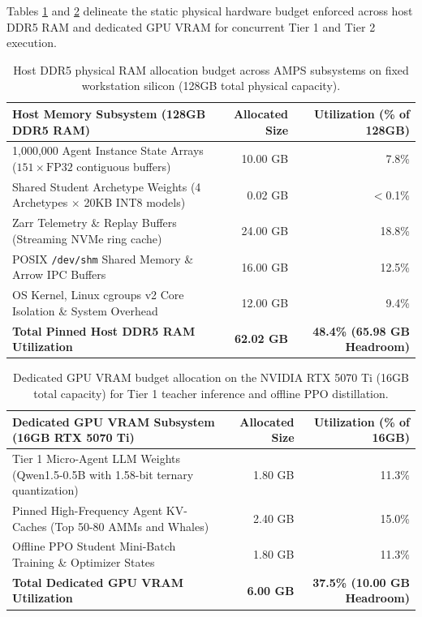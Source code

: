 Tables \ref{tab:hardware_budget_allocation} and \ref{tab:vram_budget_allocation} delineate the static physical hardware budget enforced across host DDR5 RAM and dedicated GPU VRAM for concurrent Tier 1 and Tier 2 execution.

\begin{table}[htbp]
\centering
\small
\renewcommand{\arraystretch}{1.05}
\begin{tabularx}{\textwidth}{X r r}
\toprule
\textbf{Host Memory Subsystem (128GB DDR5 RAM)} & \textbf{Allocated Size} & \textbf{Utilization (\% of 128GB)} \\
\midrule
1,000,000 Agent Instance State Arrays ($151 \times \text{FP32}$ contiguous buffers) & 10.00 GB & 7.8\% \\
Shared Student Archetype Weights (4 Archetypes $\times$ 20KB INT8 models) & 0.02 GB & $<$0.1\% \\
Zarr Telemetry \& Replay Buffers (Streaming NVMe ring cache) & 24.00 GB & 18.8\% \\
POSIX \texttt{/dev/shm} Shared Memory \& Arrow IPC Buffers & 16.00 GB & 12.5\% \\
OS Kernel, Linux cgroups v2 Core Isolation \& System Overhead & 12.00 GB & 9.4\% \\
\midrule
\textbf{Total Pinned Host DDR5 RAM Utilization} & \textbf{62.02 GB} & \textbf{48.4\% (65.98 GB Headroom)} \\
\bottomrule
\end{tabularx}
\caption{Host DDR5 physical RAM allocation budget across AMPS subsystems on fixed workstation silicon (128GB total physical capacity).}
\label{tab:hardware_budget_allocation}
\end{table}

\begin{table}[htbp]
\centering
\small
\renewcommand{\arraystretch}{1.05}
\begin{tabularx}{\textwidth}{X r r}
\toprule
\textbf{Dedicated GPU VRAM Subsystem (16GB RTX 5070 Ti)} & \textbf{Allocated Size} & \textbf{Utilization (\% of 16GB)} \\
\midrule
Tier 1 Micro-Agent LLM Weights (Qwen1.5-0.5B with 1.58-bit ternary quantization) & 1.80 GB & 11.3\% \\
Pinned High-Frequency Agent KV-Caches (Top 50-80 AMMs and Whales) & 2.40 GB & 15.0\% \\
Offline PPO Student Mini-Batch Training \& Optimizer States & 1.80 GB & 11.3\% \\
\midrule
\textbf{Total Dedicated GPU VRAM Utilization} & \textbf{6.00 GB} & \textbf{37.5\% (10.00 GB Headroom)} \\
\bottomrule
\end{tabularx}
\caption{Dedicated GPU VRAM budget allocation on the NVIDIA RTX 5070 Ti (16GB total capacity) for Tier 1 teacher inference and offline PPO distillation.}
\label{tab:vram_budget_allocation}
\end{table}

